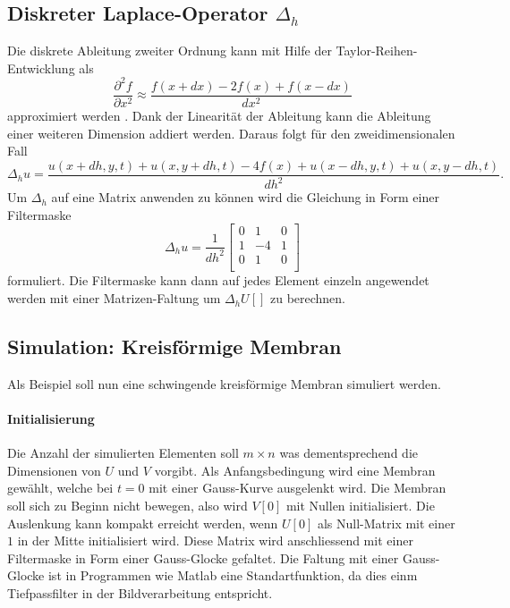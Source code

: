 \subsection{Diskreter Laplace-Operator $\Delta_h$}
Die diskrete Ableitung zweiter Ordnung kann mit Hilfe der Taylor-Reihen-Entwicklung als
\begin{equation*}
	\frac{\partial^2f}{\partial x^2} \approx \frac{f(x+dx)-2f(x)+f(x-dx)}{dx^2}
\end{equation*}
approximiert werden \cite{kreismembran:Digital_Image_processing}.
Dank der Linearität der Ableitung kann die Ableitung einer weiteren Dimension addiert werden.
Daraus folgt für den zweidimensionalen Fall 
\begin{equation*}
	\Delta_h u= \frac{u(x+dh,y,t)+u(x,y+dh,t)-4f(x)+u(x-dh,y,t)+u(x,y-dh,t)}{dh^2}.
\end{equation*}
Um $ \Delta_h $ auf eine Matrix anwenden zu können wird die Gleichung in Form einer Filtermaske 
 \begin{equation}
 	\Delta_h u= \frac{1}{dh^2}
 	\left[ {\begin{array}{ccc}
 			0 & 1  & 0\\
 			1 & -4 & 1\\
 			0 & 1  & 0\\
 	\end{array} } \right]
 \end{equation}
formuliert.
Die Filtermaske kann dann auf jedes Element einzeln angewendet werden mit einer Matrizen-Faltung um $ \Delta_h U[] $ zu berechnen.

\subsection{Simulation: Kreisförmige Membran}
Als Beispiel soll nun eine schwingende kreisförmige Membran simuliert werden.
\paragraph{Initialisierung}
Die Anzahl der simulierten Elementen soll $ m \times n $ was dementsprechend die Dimensionen von $ U $ und $ V $ vorgibt.
Als Anfangsbedingung wird eine Membran gewählt, welche bei $ t=0 $ mit einer Gauss-Kurve ausgelenkt wird.
Die Membran soll sich zu Beginn nicht bewegen, also wird $ V[0] $ mit Nullen initialisiert.
Die Auslenkung kann kompakt erreicht werden, wenn $ U[0] $ als Null-Matrix mit einer $ 1 $ in der Mitte initialisiert wird. 
Diese Matrix wird anschliessend mit einer Filtermaske in Form einer Gauss-Glocke gefaltet.
Die Faltung mit einer Gauss-Glocke ist in Programmen wie Matlab eine Standartfunktion, da dies einm Tiefpassfilter in der Bildverarbeitung entspricht.

